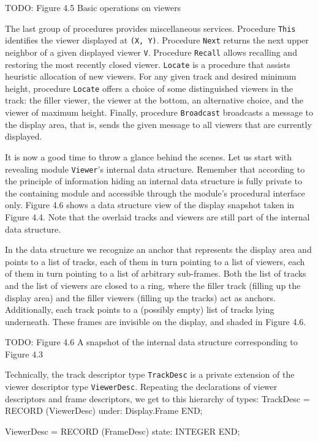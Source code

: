 TODO: Figure 4.5 Basic operations on viewers

The last group of procedures provides miscellaneous
services. Procedure {\tt This\/} identifies the viewer displayed at {\tt (X, Y)\/}.
Procedure {\tt Next\/} returns the next upper neighbor of a given
displayed viewer {\tt V\/}. Procedure {\tt Recall\/} allows recalling and restoring
the most recently closed viewer. {\tt Locate\/} is a procedure that assists
heuristic allocation of new viewers. For any given track and desired
minimum height, procedure {\tt Locate\/} offers a choice of some distinguished
viewers in the track: the filler viewer, the viewer at the bottom, an
alternative choice, and the viewer of maximum height. Finally,
procedure {\tt Broadcast\/} broadcasts a message to the display area, that is,
sends the given message to all viewers that are currently displayed.

It is now a good time to throw a glance behind the scenes. Let us
start with revealing module {\tt Viewer\/}’s internal data structure. Remember
that according to the principle of information hiding an internal data
structure is fully private to the containing module and accessible
through the module’s procedural interface only. Figure 4.6 shows a
data structure view of the display snapshot taken in Figure 4.4. Note
that the overlaid tracks and viewers are still part of the internal
data structure.

In the data structure we recognize an anchor that represents the
display area and points to a list of tracks, each of them in turn
pointing to a list of viewers, each of them in turn pointing to a list
of arbitrary sub-frames. Both the list of tracks and the list of
viewers are closed to a ring, where the filler track (filling up the
display area) and the filler viewers (filling up the tracks) act as
anchors. Additionally, each track points to a (possibly empty) list of
tracks lying underneath. These frames are invisible on the display,
and shaded in Figure 4.6.

TODO: Figure 4.6 A snapshot of the internal data structure corresponding to Figure 4.3

Technically, the track descriptor type {\tt TrackDesc\/} is a private
extension of the viewer descriptor type {\tt ViewerDesc\/}. Repeating the
declarations of viewer descriptors and frame descriptors, we get to
this hierarchy of types:
\begintt
TrackDesc = RECORD (ViewerDesc)
  under: Display.Frame
END;

ViewerDesc = RECORD (FrameDesc)
  state: INTEGER
END;

